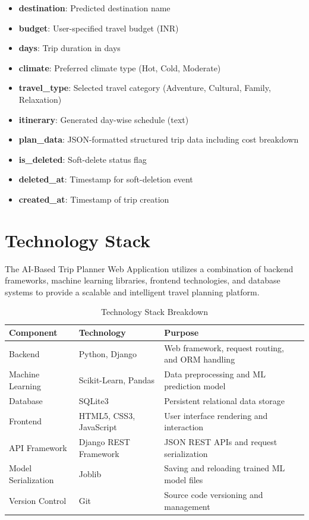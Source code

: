 \begin{itemize}
    \item \textbf{destination}: Predicted destination name
    \item \textbf{budget}: User-specified travel budget (INR)
    \item \textbf{days}: Trip duration in days
    \item \textbf{climate}: Preferred climate type (Hot, Cold, Moderate)
    \item \textbf{travel\_type}: Selected travel category (Adventure, Cultural, Family, Relaxation)
    \item \textbf{itinerary}: Generated day-wise schedule (text)
    \item \textbf{plan\_data}: JSON-formatted structured trip data including cost breakdown
    \item \textbf{is\_deleted}: Soft-delete status flag
    \item \textbf{deleted\_at}: Timestamp for soft-deletion event
    \item \textbf{created\_at}: Timestamp of trip creation
\end{itemize}

\section{Technology Stack}

The AI-Based Trip Planner Web Application utilizes a combination of backend frameworks, machine learning libraries, frontend technologies, and database systems to provide a scalable and intelligent travel planning platform.

\begin{table}[H]
    \centering
    \caption{Technology Stack Breakdown}
    \label{tab:tech-stack}
    \begin{tabularx}{\textwidth}{@{} l l >{\raggedright\arraybackslash}X @{}}
        \toprule
        \textbf{Component} & \textbf{Technology} & \textbf{Purpose} \\
        \midrule
        Backend            & Python, Django           & Web framework, request routing, and ORM handling \\
        Machine Learning   & Scikit-Learn, Pandas     & Data preprocessing and ML prediction model \\
        Database           & SQLite3                  & Persistent relational data storage \\
        Frontend           & HTML5, CSS3, JavaScript  & User interface rendering and interaction \\
        API Framework      & Django REST Framework    & JSON REST APIs and request serialization \\
        Model Serialization & Joblib                  & Saving and reloading trained ML model files \\
        Version Control    & Git                      & Source code versioning and management \\
        \bottomrule
    \end{tabularx}
\end{table}

